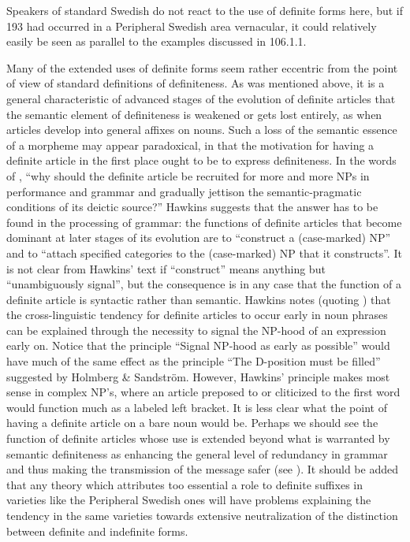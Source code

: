 \begin{styleBodyTextFirst}
Speakers of standard Swedish do not react to the use of definite forms here, but if 193 had occurred in a Peripheral Swedish area vernacular, it could relatively easily be seen as parallel to the examples discussed in 106.1.1.

\end{styleBodyTextFirst}

\begin{styleBodytextC}
Many of the extended uses of definite forms seem rather eccentric from the point of view of standard definitions of definiteness. As was mentioned above, it is a general characteristic of advanced stages of the evolution of definite articles that the semantic element of definiteness is weakened or gets lost entirely, as when articles develop into general affixes on nouns. Such a loss of the semantic essence of a morpheme may appear paradoxical, in that the motivation for having a definite article in the first place ought to be to express definiteness. In the words of \citet[91]{Hawkins2004}, “why should the definite article be recruited for more and more NPs in performance and grammar and gradually jettison the semantic-pragmatic conditions of its deictic source?”  Hawkins suggests that the answer has to be found in the processing of grammar: the functions of definite articles that become dominant at later stages of its evolution are to “construct a (case-marked) NP” and to “attach specified categories to the (case-marked) NP that it constructs”. It is not clear from Hawkins’ text if “construct” means anything but “unambiguously signal”, but the consequence is in any case that the function of a definite article is syntactic rather than semantic. Hawkins notes (quoting \citet[64]{Lyons1999}) that the cross-linguistic tendency for definite articles to occur early in noun phrases can be explained through the necessity to signal the NP-hood of an expression early on. Notice that the principle “Signal NP-hood as early as possible” would have much of the same effect as the principle “The D-position must be filled” suggested by Holmberg \& Sandström. However, Hawkins’ principle makes most sense in complex NP’s, where an article preposed to or cliticized to the first word would function much as a labeled left bracket. It is less clear what the point of having a definite article on a bare noun would be. Perhaps we should see the function of definite articles whose use is extended beyond what is warranted by semantic definiteness as enhancing the general level of redundancy in grammar and thus making the transmission of the message safer (see \citet[9-11]{Dahl2004}). It should be added that any theory which attributes too essential a role to definite suffixes in varieties like the Peripheral Swedish ones will have problems explaining the tendency in the same varieties towards extensive neutralization of the distinction between definite and indefinite forms. 

\end{styleBodytextC}

